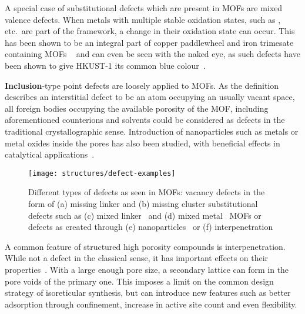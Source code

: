 A special case of substitutional defects which are present in MOFs
are mixed valence defects. When metals with multiple stable oxidation
states, such as ,  etc.\ are part of
the framework, a change in their oxidation state can occur. This has
been shown to be an integral part of copper paddlewheel and
iron trimesate containing MOFs
~\cite{yoonControlledReducibilityMetalOrganic2010} and can even be
seen with the naked eye, as such defects have been shown
to give HKUST-1 its common blue colour~\cite{mullerDefectsColorCenters2017}.

\textbf{Inclusion}-type point defects are loosely applied to MOFs.
As the definition describes an interstitial defect
to be an atom occupying an usually vacant space, all foreign
bodies occupying the available porosity of the MOF, including
aforementioned counterions and solvents could be considered as
defects in the traditional crystallographic sense.
Introduction of nanoparticles such as metals or metal oxides
inside the pores has also been studied, with beneficial
effects in catalytical 
applications~\cite{falcaroApplicationMetalMetal2016, %
    schroderRutheniumNanoparticlesPorous2008}.

\begin{figure}[htb]
	\centering

	\texttt{[image: structures/defect-examples]}
	\caption{
		Different types of defects as seen in MOFs: 
		vacancy defects in the form of (a) missing linker and 
		(b) missing cluster substitutional defects such as
		(c) mixed linker~\cite{buekenTacklingDefectConundrum2017}
		and (d) mixed metal~\cite{chenPorousCuCd2004} MOFs or defects 
		as created through (e) nanoparticles~\cite{schroderRutheniumNanoparticlesPorous2008}
		or (f) interpenetration~\cite{yaoInterpenetratedMetalOrganic2012}
	}%
	\label{def:fgr:defect-types}
\end{figure}

A common feature of structured high porosity compounds is
interpenetration. While not a defect in the classical sense,
it has important effects on their 
properties~\cite{haldarInterpenetrationCoordinationPolymers2015}.
With a large enough pore size, a secondary lattice can form in the
pore voids of the primary one. This imposes a limit on the
common design strategy of isoreticular synthesis, but can
introduce new features such as better adsorption through
confinement, increase in active site count and even flexibility.

